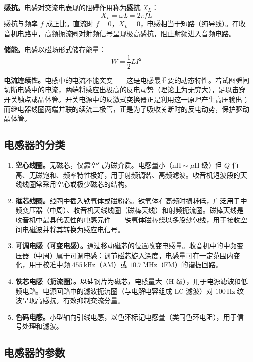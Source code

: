 \documentclass[12pt,UTF8]{ctexbook}
\begin{document}
\textbf{感抗。}电感对交流电表现的阻碍作用称为\textbf{感抗} $X_L$：
\[
X_L = \omega L = 2\pi f L
\]
感抗与频率 $f$ 成正比。直流时 $f=0$，$X_L=0$，电感相当于短路（纯导线）。在收音机电路中，高频扼流圈对射频信号呈现极高感抗，阻止射频进入音频电路。

\textbf{储能。}电感以磁场形式储存能量：
\[
W = \frac{1}{2} L I^2
\]

\textbf{电流连续性。}电感中的电流不能突变——这是电感最重要的动态特性。若试图瞬间切断电感中的电流，两端将感应出极高的反电动势（理论上为无穷大），足以击穿开关触点或晶体管。开关电源中的反激式变换器正是利用这一原理产生高压输出；而继电器线圈两端并联的续流二极管，正是为了吸收关断时的反电动势，保护驱动晶体管。

\subsection{电感器的分类}

\begin{enumerate}
\item \textbf{空心线圈。}无磁芯，仅靠空气为磁介质。电感量小（$\mathrm{nH}\sim\mu\mathrm{H}$ 级）但 $Q$ 值高、无磁饱和、频率特性极好，用于射频调谐、高频滤波。收音机短波段的天线线圈常采用空心或极少磁芯的结构。

\item \textbf{磁芯线圈。}线圈中插入铁氧体或磁粉芯。铁氧体在高频时损耗低，广泛用于中频变压器（中周）、收音机天线线圈（磁棒天线）和射频扼流圈。磁棒天线是收音机中最具代表性的电感元件——铁氧体磁棒绕以多股纱包线，用于接收空间电磁波并将其转换为感应电信号。

\item \textbf{可调电感（可变电感）。}通过移动磁芯的位置改变电感量。收音机中的中频变压器（中周）属于可调电感：调节磁芯旋入深度，电感量可在一定范围内变化，用于校准中频 $455\,\mathrm{kHz}$（AM）或 $10.7\,\mathrm{MHz}$（FM）的谐振回路。

\item \textbf{铁芯电感（扼流圈）。}以硅钢片为磁芯，电感量大（H 级），用于电源滤波和低频电路。电源回路中的滤波扼流圈（与电解电容组成 LC 滤波）对 $100\,\mathrm{Hz}$ 纹波呈现高感抗，有效抑制交流分量。

\item \textbf{色码电感。}小型轴向引线电感，以色环标记电感量（类同色环电阻），用于信号处理和滤波。
\end{enumerate}

\subsection{电感器的参数}
\end{document}
